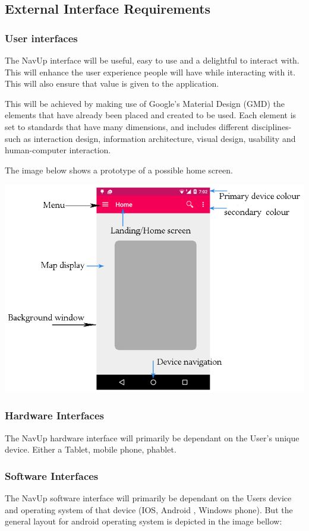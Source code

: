 \documentclass[11pt]{article}
\begin{document}
		\subsection{External Interface Requirements}
						
				\subsubsection{User interfaces}
				
				The NavUp interface will be useful, easy to use and a delightful to interact with. This will enhance the user experience people will have while interacting with it. This will also ensure that value is given to the application.
				
				This will be achieved by making use of Google's Material Design (GMD) the elements that have already been placed and created to be used. Each element is set to standards that have many dimensions, and includes different disciplines-such as interaction design, information architecture, visual design, usability and human-computer interaction.
				
				The image below shows a prototype of a possible home screen.
				
				\includegraphics[width=0.5\linewidth]{Images/userInterface.jpg}\\[0.5cm]
				
				\subsubsection{Hardware Interfaces}
				The NavUp hardware interface will primarily be dependant on the User’s unique device. Either a Tablet, mobile phone, phablet. 	
					
				\subsubsection{Software Interfaces}
				The NavUp software  interface will primarily be dependant on the Users device and operating system of that device (IOS, Android , Windows phone). But the general layout for android operating system is depicted in the image bellow:
				
\end{document}
